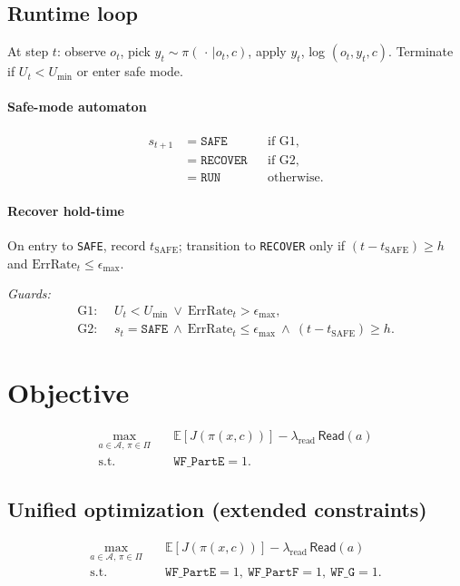 \documentclass[conference]{IEEEtran}
\begin{document}
\subsection{Runtime loop}
At step $t$: observe $o_t$, pick $y_t\sim\pi(\,\cdot\,|o_t,c)$, apply $y_t$, log $(o_t,y_t,c)$.
Terminate if $U_t<U_{\min}$ or enter safe mode.

\paragraph{Safe-mode automaton}
\begin{equation}
\label{eq:safe-mode}
\begin{aligned}
s_{t+1}&=\mathtt{SAFE}    &&\text{if G1},\\
       & =\mathtt{RECOVER}&&\text{if G2},\\
       & =\mathtt{RUN}    &&\text{otherwise.}
\end{aligned}
\end{equation}

\paragraph{Recover hold-time}
On entry to \texttt{SAFE}, record $t_{\mathrm{SAFE}}$; transition to \texttt{RECOVER}
only if $(t-t_{\mathrm{SAFE}})\ge h$ and $\mathrm{ErrRate}_t\le \epsilon_{\max}$.

\noindent\textit{Guards:}
\[
\begin{aligned}
\text{G1: }&\ U_t < U_{\min}\ \lor\ \mathrm{ErrRate}_t > \epsilon_{\max},\\
\text{G2: }&\ s_t=\mathtt{SAFE}\ \land\ \mathrm{ErrRate}_t\le\epsilon_{\max}\ \land\ (t-t_{\mathrm{SAFE}})\ge h.
\end{aligned}
\]

\section{Objective}
\begin{equation}
\label{eq:obj}
\begin{aligned}
\max_{a\in\mathcal{A},\,\pi\in\Pi}\quad
&\mathbb{E}\!\left[J(\pi(x,c))\right]
-\lambda_{\mathrm{read}}\,\mathsf{Read}(a)\\
\text{s.t.}\quad & \mathtt{WF\_PartE}=1.
\end{aligned}
\end{equation}

\subsection{Unified optimization (extended constraints)}
\begin{equation}
\label{eq:obj-extended}
\begin{aligned}
\max_{a\in\mathcal{A},\,\pi\in\Pi}\quad
&\mathbb{E}\!\left[J(\pi(x,c))\right]
-\lambda_{\mathrm{read}}\,\mathsf{Read}(a)\\
\text{s.t.}\quad&
\mathtt{WF\_PartE}=1,\ \mathtt{WF\_PartF}=1,\ \mathtt{WF\_G}=1.
\end{aligned}
\end{equation}
\end{document}
